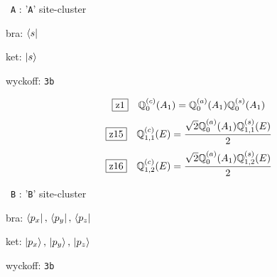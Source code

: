 \documentclass[fleqn,10pt,landscape]{jsarticle}
\begin{document}
\vspace{5mm}

\noindent\textbullet\, \texttt{A} : '\texttt{A}' site-cluster

\noindent\quad * bra: $\bra{s}$

\noindent\quad * ket: $\ket{s}$

\noindent\quad * wyckoff: \texttt{3b}

\begin{dmath*}
\hspace*{3mm}\fbox{z1}\quad \mathbb{Q}_{0}^{(c)}(A_{1})=\mathbb{Q}_{0}^{(a)}(A_{1}) \mathbb{Q}_{0}^{(s)}(A_{1})
\end{dmath*}
\begin{dmath*}
\hspace*{3mm}\fbox{z15}\quad \mathbb{Q}_{1,1}^{(c)}(E)=\frac{\sqrt{2} \mathbb{Q}_{0}^{(a)}(A_{1}) \mathbb{Q}_{1,1}^{(s)}(E)}{2}
\end{dmath*}
\begin{dmath*}
\hspace*{3mm}\fbox{z16}\quad \mathbb{Q}_{1,2}^{(c)}(E)=\frac{\sqrt{2} \mathbb{Q}_{0}^{(a)}(A_{1}) \mathbb{Q}_{1,2}^{(s)}(E)}{2}
\end{dmath*}
\vspace{5mm}

\noindent\textbullet\, \texttt{B} : '\texttt{B}' site-cluster

\noindent\quad * bra: $\bra{p_{x}},\, \bra{p_{y}},\, \bra{p_{z}}$

\noindent\quad * ket: $\ket{p_{x}},\, \ket{p_{y}},\, \ket{p_{z}}$

\noindent\quad * wyckoff: \texttt{3b}
\end{document}
